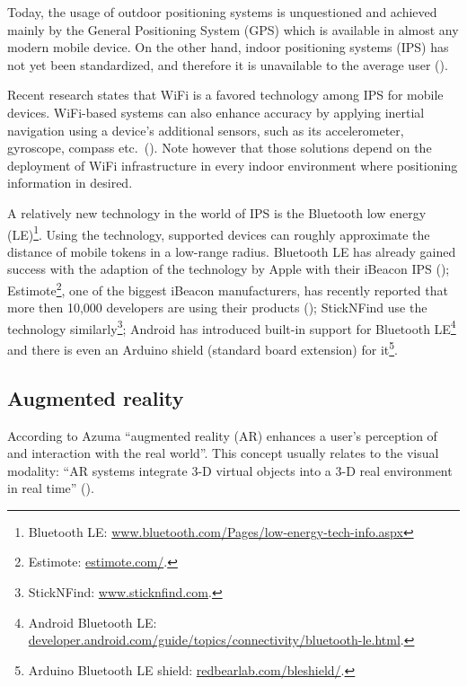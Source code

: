 \documentclass[a4paper,11pt]{article}
\begin{document}
Today, the usage of outdoor positioning systems is unquestioned and achieved mainly by the General Positioning System (GPS) which is available in almost any modern mobile device.
On the other hand, indoor positioning systems (IPS) has not yet been standardized, and therefore it is unavailable to the average user (\cite{web:turetsky}).

Recent research states that WiFi is a favored technology among IPS for mobile devices.
WiFi-based systems can also enhance accuracy by applying inertial navigation using a device's additional sensors, such as its accelerometer, gyroscope, compass etc.\ (\cite{web:harrop}).
Note however that those solutions depend on the deployment of WiFi infrastructure in every indoor environment where positioning information in desired.

A relatively new technology in the world of IPS is the Bluetooth low energy (LE)\footnote{Bluetooth LE: \href{http://www.bluetooth.com/Pages/low-energy-tech-info.aspx}{www.bluetooth.com/Pages/low-energy-tech-info.aspx}}.
Using the technology, supported devices can roughly approximate the distance of mobile tokens in a low-range radius.
Bluetooth LE has already gained success with the adaption of the technology by Apple with their iBeacon IPS (\cite{web:danova});
Estimote\footnote{Estimote: \href{http://estimote.com/}{estimote.com/}.}, one of the biggest iBeacon manufacturers, has recently reported that more then 10,000 developers are using their products (\cite{web:thompson});
StickNFind use the technology similarly\footnote{StickNFind: \href{https://www.sticknfind.com}{www.sticknfind.com}.};
Android has introduced built-in support for Bluetooth LE\footnote{Android Bluetooth LE: \href{http://developer.android.com/guide/topics/connectivity/bluetooth-le.html}{developer.android.com/guide/topics/connectivity/bluetooth-le.html}.} and there is even an Arduino shield (standard board extension) for it\footnote{Arduino Bluetooth LE shield: \href{http://redbearlab.com/bleshield/}{redbearlab.com/bleshield/}.}.

\subsection{Augmented reality}

According to Azuma ``augmented reality (AR) enhances a user's perception of and interaction with the real world''.
This concept usually relates to the visual modality: ``AR systems integrate 3-D virtual objects into a 3-D real environment in real time'' (\cite{azuma97}).
\end{document}
